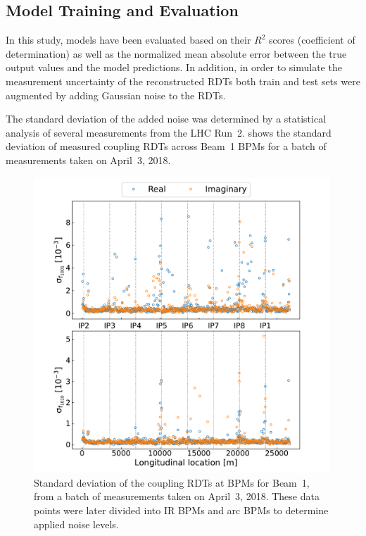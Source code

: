 \subsection{Model Training and Evaluation}

In this study, models have been evaluated based on their \(R^2\) scores (coefficient of determination) as well as the normalized mean absolute error between the true output values and the model predictions.
In addition, in order to simulate the measurement uncertainty of the reconstructed RDTs both train and test sets were augmented by adding Gaussian noise to the RDTs.

The standard deviation of the added noise was determined by a statistical analysis of several measurements from the LHC Run~\num{2}.
 shows the standard deviation of measured coupling RDTs across Beam~\num{1} BPMs for a batch of measurements taken on April~\num{3}, \num{2018}.

\begin{figure}[!htb]
    \centering
    \includegraphics*[width=0.99\textwidth]{Figures/ML_for_IR_Coupling/ml_rdts_batch_stdev.pdf}
    \caption{Standard deviation of the coupling RDTs at BPMs for Beam~\num{1}, from a batch of measurements taken on April~\num{3}, \num{2018}. These data points were later divided into IR BPMs and arc BPMs to determine applied noise levels.}
    \label{figure:rdts_stdev_batch}
\end{figure}

